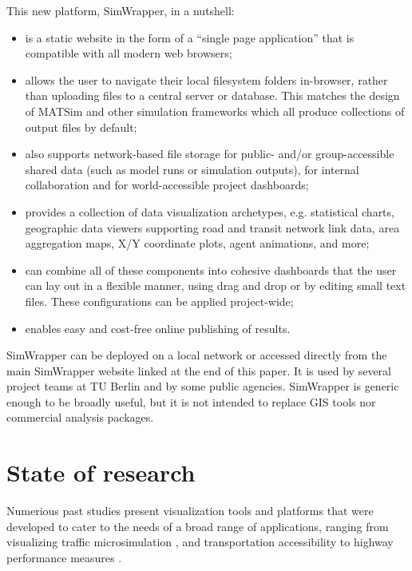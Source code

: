 \documentclass[3p,times,procedia]{elsarticle}
\begin{document}
This new platform, SimWrapper, in a nutshell:

\begin{itemize}[]
\item
    is a static website in the form of a ``single page application'' that is compatible with all modern web browsers;
\item
    allows the user to navigate their local filesystem folders in-browser, rather than uploading files to a central server or database. This matches the design of MATSim and other simulation frameworks which all produce collections of output files by default;
\item
    also supports network-based file storage for public- and/or group-accessible shared data (such as model runs or simulation outputs), for internal collaboration and for world-accessible project dashboards;
\item
    provides a collection of data visualization archetypes, e.g. statistical charts, geographic data viewers supporting road and transit network link data, area aggregation maps, X/Y coordinate plots, agent animations, and more;
\item
    can combine all of these components into cohesive dashboards that the user can lay out in a flexible manner, using drag and drop or by editing small text files. These configurations can be applied project-wide;
\item
    enables easy and cost-free online publishing of results.
\end{itemize}

SimWrapper can be deployed on a local network or accessed directly from the main SimWrapper website linked at the end of this paper. It is used by several project teams at TU Berlin and by some public agencies. SimWrapper is generic enough to be broadly useful, but it is not intended to replace GIS tools nor commercial analysis packages.

\section{State of research}

Numerious past studies present visualization tools and platforms that were developed to cater to the needs of a broad range of applications, ranging from visualizing traffic microsimulation \cite{CHARLTON2021728,lu2015global}, and transportation accessibility \cite{yin2015understanding} to highway performance measures \cite{NAP26651}.
\end{document}
